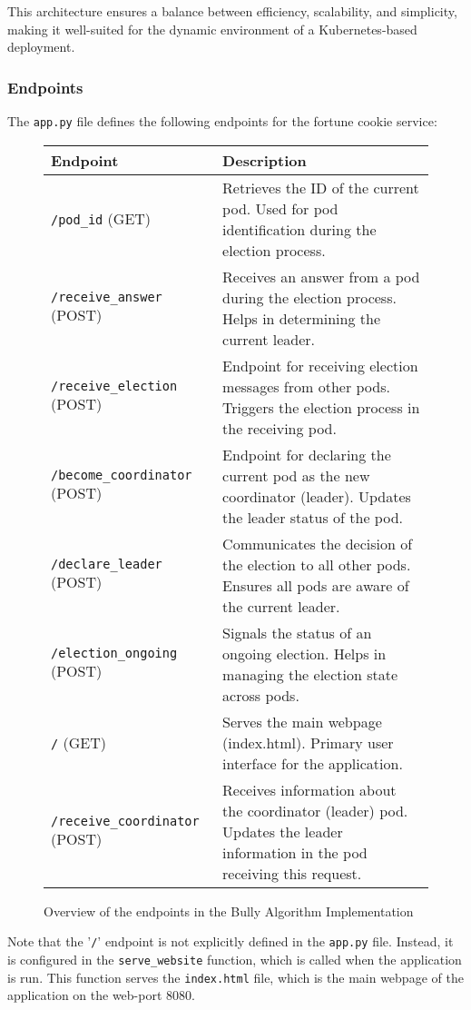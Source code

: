\documentclass{article}
\begin{document}
    This architecture ensures a balance between efficiency, scalability, and simplicity, making it well-suited for the dynamic environment of a Kubernetes-based deployment.

  \subsubsection*{Endpoints}
    The \texttt{app.py} file defines the following endpoints for the fortune cookie service:
    \begin{figure}[h!]
\centering
\begin{tabular}{|l|p{10cm}|}
\hline
\textbf{Endpoint} & \textbf{Description} \\
\hline
\texttt{/pod\_id} (GET) & Retrieves the ID of the current pod. Used for pod identification during the election process. \\
\hline
\texttt{/receive\_answer} (POST) & Receives an answer from a pod during the election process. Helps in determining the current leader. \\
\hline
\texttt{/receive\_election} (POST) & Endpoint for receiving election messages from other pods. Triggers the election process in the receiving pod. \\
\hline
\texttt{/become\_coordinator} (POST) & Endpoint for declaring the current pod as the new coordinator (leader). Updates the leader status of the pod. \\
\hline
\texttt{/declare\_leader} (POST) & Communicates the decision of the election to all other pods. Ensures all pods are aware of the current leader. \\
\hline
\texttt{/election\_ongoing} (POST) & Signals the status of an ongoing election. Helps in managing the election state across pods. \\
\hline
\texttt{/} (GET) & Serves the main webpage (index.html). Primary user interface for the application. \\
\hline
\texttt{/receive\_coordinator} (POST) & Receives information about the coordinator (leader) pod. Updates the leader information in the pod receiving this request. \\
\hline
\end{tabular}
\caption{Overview of the endpoints in the Bully Algorithm Implementation}
\label{fig:endpoints}
\end{figure}

Note that the '\texttt{/}' endpoint is not explicitly defined in the \texttt{app.py} file. Instead, it is configured in the \texttt{serve\_website} function, which is called when the application is run. This function serves the \texttt{index.html} file, which is the main webpage of the application on the web-port 8080.
      
\end{document}
